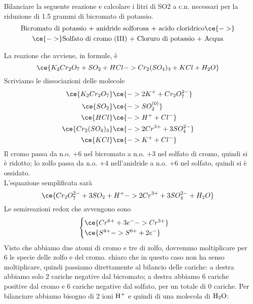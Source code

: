 \begin{esercizio}
    Bilanciare la seguente reazione e calcolare i litri di SO2 a c.n. necessari per la riduzione di 1.5 grammi di bicromato di potassio.
    \begin{gather*}
        \text{Bicromato di potassio + anidride solforosa + acido cloridrico} \ce{->}
        \\
        \ce{->} \text{Solfato di cromo (III) + Cloruro di potassio + Acqua}
    \end{gather*}
\end{esercizio}
\begin{soluzione}
    La reazione che avviene, in formule, è
    \begin{equation*}
        \ce{K_2Cr_2O_7 + SO_2 + HCl -> Cr_2(SO_4)_3 + KCl + H_2O}
    \end{equation*}
    Scriviamo le dissociazioni delle molecole
    \begin{equation*}
        \begin{split}
            \ce{K_2Cr_2O_7} & \ce{-> 2K^+ + Cr_2O_7^{2-}}
            \\
            \ce{SO_2} & \ce{-> SO_2^{(0)}}
            \\
            \ce{HCl} & \ce{-> H^+ + Cl^-}
            \\
            \ce{Cr_2(SO_4)_3} & \ce{-> 2Cr^{3+} + 3SO_4^{2-}}
            \\
            \ce{KCl} & \ce{-> K^+ + Cl^-}
        \end{split}
    \end{equation*}
    Il cromo passa da n.o. $+6$ nel bicromato a n.o. $+3$ nel solfato di cromo, quindi si è ridotto; lo zolfo passa da n.o. $+4$ nell'anidride a n.o. $+6$ nel solfato, quindi si è ossidato.\\
    L'equazione semplificata sarà
    \begin{equation*}
        \ce{Cr_2O_7^{2-} + 3SO_2 + H^+ -> 2Cr^{3+} + 3SO_4^{2-} + H_2O}
    \end{equation*}
    Le semireazioni redox che avvengono sono
    \begin{equation*}
        \begin{cases}
            \ce{Cr^{6+} +3e^- -> Cr^{3+}}\\
            \ce{S^{4+} -> S^{6+} +2e^-}
        \end{cases}
    \end{equation*}
    Visto che abbiamo due atomi di cromo e tre di zolfo, dovremmo moltiplicare per 6 le specie delle zolfo e del cromo. \E chiaro che in questo caso non ha senso moltiplicare, quindi passiamo direttamente al bilancio delle cariche: a destra abbiamo solo 2 cariche negative dal bicromato; a destra abbiamo 6 cariche positive dal cromo e 6 cariche negative dal solfato, per un totale di 0 cariche. Per bilanciare abbiamo bisogno di 2 ioni $\rm H^+$ e quindi di una molecola di $\rm H_2O$:

\end{soluzione}
